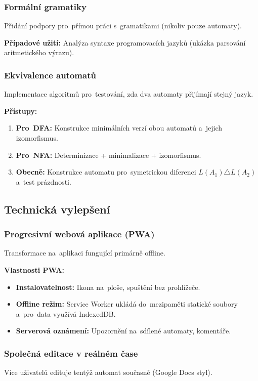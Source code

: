 \documentclass[
  master,
  program=ainfvs,
  printversion,
  figures=false,
  tables=false,
  glossaries,
  index
]{kidiplom}
\begin{document}
\subsubsection{Formální gramatiky}
Přidání podpory pro~přímou práci s~gramatikami (nikoliv pouze automaty).

\textbf{Případové užití:} Analýza syntaxe programovacích jazyků (ukázka parsování aritmetického výrazu).

\subsubsection{Ekvivalence automatů}
Implementace algoritmů pro~testování, zda dva automaty přijímají stejný jazyk.

\textbf{Přístupy:}
\begin{enumerate}
    \item \textbf{Pro~DFA:} Konstrukce minimálních verzí obou automatů a~jejich izomorfismus.
    \item \textbf{Pro~NFA:} Determinizace + minimalizace + izomorfismus.
    \item \textbf{Obecně:} Konstrukce automatu pro~symetrickou diferenci $L(A_1) \triangle L(A_2)$ a~test prázdnosti.
\end{enumerate}

\subsection{Technická vylepšení}

\subsubsection{Progresivní webová aplikace (PWA)}
Transformace na~aplikaci fungující primárně offline.

\textbf{Vlastnosti PWA:}
\begin{itemize}
    \item \textbf{Instalovatelnost:} Ikona na~ploše, spuštění bez prohlížeče.
    \item \textbf{Offline režim:} Service Worker ukládá do~mezipaměti statické soubory a~pro~data využívá IndexedDB.
    \item \textbf{Serverová oznámení:} Upozornění na~sdílené automaty, komentáře.
\end{itemize}

\subsubsection{Společná editace v reálném čase}
Více uživatelů edituje tentýž automat současně (Google Docs styl).
\end{document}

